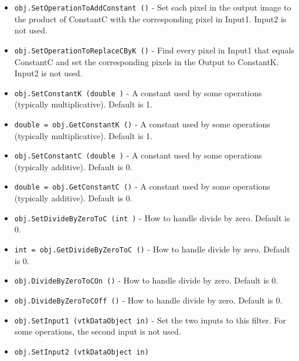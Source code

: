 \begin{itemize}
\item  \verb|obj.SetOperationToAddConstant ()| -  Set each pixel in the output image to the product of ConstantC with the
 corresponding pixel in Input1. Input2 is not used.

\item  \verb|obj.SetOperationToReplaceCByK ()| -  Find every pixel in Input1 that equals ConstantC and set the corresponding pixels
 in the Output to ConstantK. Input2 is not used.

\item  \verb|obj.SetConstantK (double )| -  A constant used by some operations (typically multiplicative). Default is 1.

\item  \verb|double = obj.GetConstantK ()| -  A constant used by some operations (typically multiplicative). Default is 1.

\item  \verb|obj.SetConstantC (double )| -  A constant used by some operations (typically additive). Default is 0.

\item  \verb|double = obj.GetConstantC ()| -  A constant used by some operations (typically additive). Default is 0.

\item  \verb|obj.SetDivideByZeroToC (int )| -  How to handle divide by zero. Default is 0.

\item  \verb|int = obj.GetDivideByZeroToC ()| -  How to handle divide by zero. Default is 0.

\item  \verb|obj.DivideByZeroToCOn ()| -  How to handle divide by zero. Default is 0.

\item  \verb|obj.DivideByZeroToCOff ()| -  How to handle divide by zero. Default is 0.

\item  \verb|obj.SetInput1 (vtkDataObject in)| -  Set the two inputs to this filter. For some operations, the second input
 is not used.

\item  \verb|obj.SetInput2 (vtkDataObject in)|

\end{itemize}
